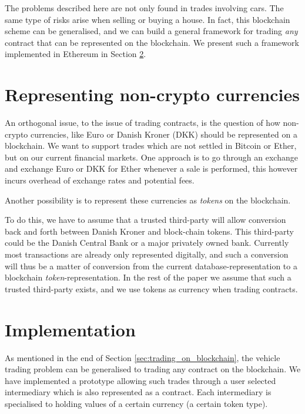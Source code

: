 \documentclass[oneside,a4paper,10pts,article]{memoir}
\begin{document}
The problems described here are not only found in trades involving
cars. The same type of risks arise when selling or buying a house. In
fact, this blockchain scheme can be generalised, and we can build a
general framework for trading \textit{any} contract that can be
represented on the blockchain. We present such a framework implemented
in Ethereum in Section \ref{sec:implementation}.



\chapter{Representing non-crypto currencies}
\label{sec:currency}
An orthogonal issue, to the issue of trading contracts, is the
question of how non-crypto currencies, like Euro or Danish Kroner
(DKK) should be represented on a blockchain. We want to support trades
which are not settled in Bitcoin or Ether, but on our current
financial markets. One approach is to go through an exchange and
exchange Euro or DKK for Ether whenever a sale is performed, this
however incurs overhead of exchange rates and potential fees.

Another possibility is to represent these currencies as
\textit{tokens} on the blockchain. 

To do this, we have to assume that a trusted third-party will allow
conversion back and forth between Danish Kroner and block-chain
tokens. This third-party could be the Danish Central Bank or a major
privately owned bank. Currently most transactions are already only
represented digitally, and such a conversion will thus be a matter of
conversion from the current database-representation to a blockchain
\emph{token}-representation. In the rest of the paper we assume that
such a trusted third-party exists, and we use tokens as currency when
trading contracts.

\chapter{Implementation}
\label{sec:implementation}
As mentioned in the end of Section \ref{sec:trading_on_blockchain},
the vehicle trading problem can be generalised to trading any contract
on the blockchain. We have implemented a prototype allowing such
trades through a user selected intermediary which is also represented
as a contract. Each intermediary is specialised to holding values of a
certain currency (a certain token type).
\end{document}
